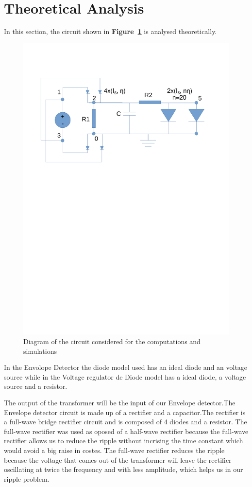 \section{Theoretical Analysis}
\label{sec:analysis}

In this section, the circuit shown in \textbf{Figure~\ref{fig:diagram_t3}} is analysed
theoretically.
\begin{figure}[H] \centering
\includegraphics[width=0.6\linewidth]{diagram_t3.pdf}
\caption{Diagram of the circuit considered for the computations and simulations}
\label{fig:diagram_t3}
\end{figure}

In the Envolope Detector the diode model used has an ideal diode and an voltage source while in the Voltage regulator de Diode model has a ideal diode, a voltage source and a resistor. 

The output of the transformer will be the input of our Envelope detector.The Envelope detector circuit is made up of a rectifier and a capacitor.The rectifier is a full-wave bridge rectifier circuit and is composed of 4 diodes and a resistor. The full-wave rectifier was used as oposed of a half-wave rectifier because the full-wave rectifier allows us to reduce the ripple without incrising the time constant which would avoid a big raise in costes. The full-wave rectifier reduces the ripple because the voltage that comes out of the transformer will leave the rectifier oscillating at twice the frequency and with less amplitude, which helps us in our ripple problem.

